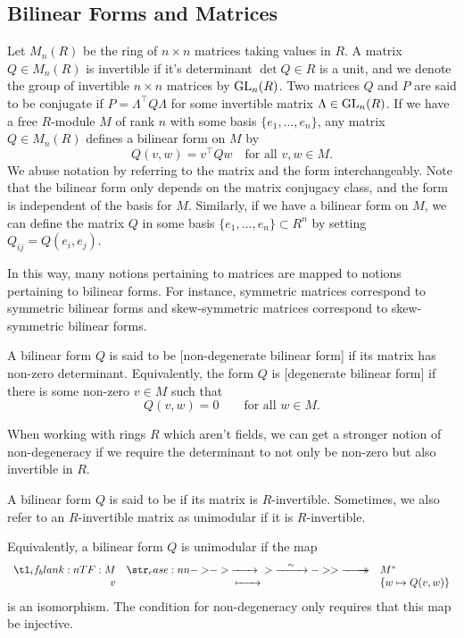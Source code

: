 \subsection*{Bilinear Forms and Matrices}

Let $M_n(R)$ be the ring of $n\times n$ matrices taking values in $R$. A matrix $Q\in M_n(R)$ is invertible if it's determinant $\det Q\in R$ is a unit, and we denote the group of invertible $n\times n$ matrices by ${\operatorname{GL}}_n(R)$. Two matrices $Q$ and $P$ are said to be conjugate if $P = \Lambda^\intercal Q\Lambda$ for some invertible matrix $\Lambda\in {\operatorname{GL}}_n(R)$. If we have a free $R$-module $M$ of rank $n$ with some basis $\{e_1,\ldots, e_n\}$, any matrix $Q\in M_n(R)$ defines a bilinear form on $M$ by
\[
	Q(v,w) = v^\intercal Q w\quad \textrm{for all }v,w\in M.
\]
We abuse notation by referring to the matrix and the form interchangeably.
Note that the bilinear form only depends on the matrix conjugacy class, and the form is independent of the basis for $M$.
Similarly, if we have a bilinear form on $M$, we can define the matrix $Q$ in some basis $\{e_1,\ldots, e_n\}\subset R^n$ by setting $Q_{ij}= Q(e_i, e_j)$.

In this way, many notions pertaining to matrices are mapped to notions pertaining to bilinear forms. For instance, symmetric matrices correspond to symmetric bilinear forms and skew-symmetric matrices correspond to skew-symmetric bilinear forms.

\begin{definition}
	A bilinear form $Q$ is said to be [non-degenerate bilinear form] if its matrix has non-zero determinant. Equivalently, the form $Q$ is [degenerate bilinear form] if there is some non-zero $v\in M$ such that
	\[Q(v,w)=0 \quad\quad \textrm{for all }w\in M.\]
\end{definition}

When working with rings $R$ which aren't fields, we can get a stronger notion of non-degeneracy if we require the determinant to not only be non-zero but also invertible in $R$.

\begin{definition}
	A bilinear form $Q$ is said to be  if its matrix is $R$-invertible. Sometimes, we also refer to an $R$-invertible matrix as unimodular if it is $R$-invertible.
\end{definition}

Equivalently, a bilinear form $Q$ is unimodular if the map
\[
	\lkxfunc{}{M}{M^\d}{v}{\left\{w\mapsto Q(v,w)\right\}}
\]
is an isomorphism. The condition for non-degeneracy only requires that this map be injective.

